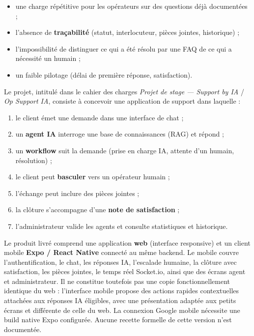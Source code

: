 \begin{itemize}[leftmargin=1.4em]
  \item une charge répétitive pour les opérateurs sur des questions déjà documentées ;
  \item l'absence de \textbf{traçabilité} (statut, interlocuteur, pièces jointes, historique) ;
  \item l'impossibilité de distinguer ce qui a été résolu par une FAQ de ce qui a nécessité un humain ;
  \item un faible pilotage (délai de première réponse, satisfaction).
\end{itemize}

Le projet, intitulé dans le cahier des charges \textit{Projet de stage --- Support by IA} / \textit{Op Support IA}, consiste à concevoir une application de support dans laquelle :

\begin{enumerate}[leftmargin=1.6em]
  \item le client émet une demande dans une interface de chat ;
  \item un \textbf{agent IA} interroge une base de connaissances (RAG) et répond ;
  \item un \textbf{workflow} suit la demande (prise en charge IA, attente d'un humain, résolution) ;
  \item le client peut \textbf{basculer} vers un opérateur humain ;
  \item l'échange peut inclure des pièces jointes ;
  \item la clôture s'accompagne d'une \textbf{note de satisfaction} ;
  \item l'administrateur valide les agents et consulte statistiques et historique.
\end{enumerate}

Le produit livré comprend une application \textbf{web} (interface responsive) et un client mobile \textbf{Expo / React Native} connecté au même backend. Le mobile couvre l'authentification, le chat, les réponses IA, l'escalade humaine, la clôture avec satisfaction, les pièces jointes, le temps réel Socket.io, ainsi que des écrans agent et administrateur. Il ne constitue toutefois pas une copie fonctionnellement identique du web : l'interface mobile propose des actions rapides contextuelles attachées aux réponses IA éligibles, avec une présentation adaptée aux petits écrans et différente de celle du web. La connexion Google mobile nécessite une build native Expo configurée. Aucune recette formelle de cette version n'est documentée.

